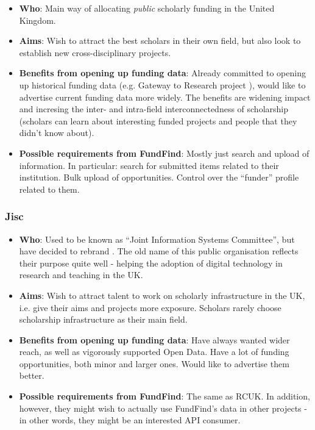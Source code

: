 \begin{itemize}
 \item \textbf{Who}: Main way of allocating \emph{public} scholarly funding in the United Kingdom.
 \item \textbf{Aims}: Wish to attract the best scholars in their own field, but also look to establish new cross-disciplinary  projects.
 \item \textbf{Benefits from opening up funding data}: Already committed to opening up historical funding data (e.g. Gateway to Research project \cite{rcuk-on-gtr}), would like to advertise current funding data more widely. The benefits are widening impact and incresing the inter- and intra-field interconnectedness of scholarship (scholars can learn about interesting funded projects and people that they didn't know about).
 \item \textbf{Possible requirements from FundFind}: Mostly just search and upload of information. In particular: search for submitted items related to their institution. Bulk upload of opportunities. Control over the ``funder'' profile related to them.
\end{itemize}

\subsubsection{Jisc}

\begin{itemize}
 \item \textbf{Who}: Used to be known as ``Joint Information Systems Committee'', but have decided to rebrand \cite{jisc-rebrand}. The old name of this public organisation reflects their purpose quite well - helping the adoption of digital technology in research and teaching in the UK.
 \item \textbf{Aims}: Wish to attract talent to work on scholarly infrastructure in the UK, i.e. give their aims and projects more exposure. Scholars rarely choose scholarship infrastructure as their main field.
 \item \textbf{Benefits from opening up funding data}: Have always wanted wider reach, as well as vigorously supported Open Data. Have a lot of funding opportunities, both minor and larger ones. Would like to advertise them better.
 \item \textbf{Possible requirements from FundFind}:  The same as RCUK. In addition, however, they might wish to actually use FundFind's data in other projects - in other words, they might be an interested API consumer.
\end{itemize}

